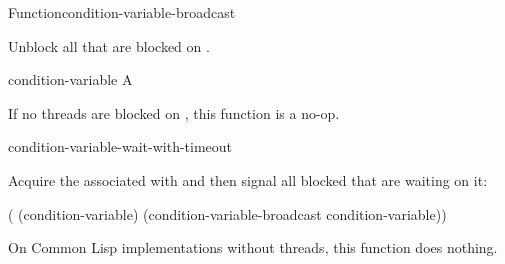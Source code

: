 \documentclass[10pt,twoside,english,pdftex]{article}
\begin{document}
\begin{functiondoc}{Function}{condition-variable-broadcast}%
  {}
%

\fnsyntax

\fnpurpose Unblock all  that are blocked on .

\fnpackage {}

\fnmodule {}

\fnargs
\begin{args}{condition-variable}
 A 
\end{args}

\fnerrors
\nocvlock{}

\fndescription If no threads are blocked on ,
this function is a no-op.

\begin{alsos}{condition-variable-wait-with-timeout}
\end{alsos}

%
\fnexample Acquire the  associated with
 and then signal all blocked 
that are waiting on it:
%
\W\supp
\begin{example}
  ( (condition-variable)
    (condition-variable-broadcast condition-variable))
\end{example}

\fnnote On Common Lisp implementations without threads, this function does
nothing.

\end{functiondoc}

\end{document}
